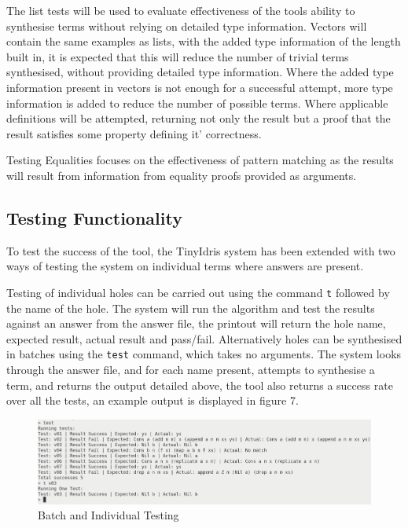 \documentclass[a4paper]{article}
\begin{document}
The list tests will be used to evaluate effectiveness of the
tools ability to synthesise terms without relying on detailed
type information. Vectors will contain the same examples as lists,
with the added type information of the length built in, it is expected that
this will reduce the number of trivial terms synthesised, without providing
detailed type information. Where the added type information present in
vectors is not enough for a successful attempt, more type information is added
to reduce the number of possible terms. Where applicable definitions will be
attempted, returning not only the result but a proof that the result satisfies
some property defining it' correctness. 

Testing Equalities focuses on the effectiveness of pattern matching
as the results will result from information from equality proofs provided
as arguments. 


\subsection{Testing Functionality}

To test the success of the tool, the TinyIdris system has been extended with two ways of testing the system on individual terms
where answers are present. 

Testing of individual holes can be carried out using the 
command \texttt{t} followed by the name of the hole. The system
will run the algorithm and test the results against an answer from
the answer file, the printout will return the hole name, expected result,
actual result and pass/fail. Alternatively holes can be synthesised in 
batches using the \texttt{test} command, which takes no arguments.
The system looks through the answer file, and for each name present,
attempts to synthesise a term, and returns the output detailed above,
the tool also returns a success rate over all the tests, an example
output is displayed in figure 7.

\begin{center}
\begin{figure}[htbp]
\centering
\includegraphics[scale=0.20]{./Resource/batch-test.png}
\caption{Batch and Individual Testing}
\end{figure}
\end{center}
\end{document}
